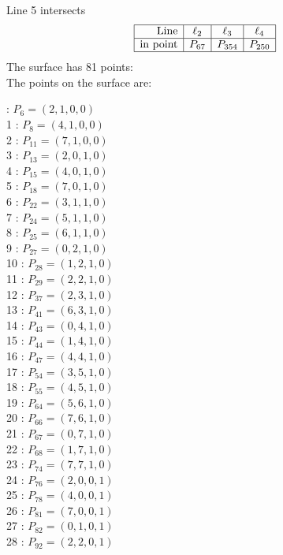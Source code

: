 \documentclass{article}
\begin{document}
{$$$$
Line 5 intersects 
$$
\begin{array}{|r*{3}{|c}|}
\hline
\mbox{Line}  & \ell_{2} & \ell_{3} & \ell_{4}\\
\hline
\mbox{in point}  & P_{67} & P_{354} & P_{250}\\
\hline
\end{array}
$$
The surface has 81 points:\\
The points on the surface are:\\
\begin{multicols}{3}
 : $P_{6}=( 2, 1, 0, 0 )$\\
1 : $P_{8}=( 4, 1, 0, 0 )$\\
2 : $P_{11}=( 7, 1, 0, 0 )$\\
3 : $P_{13}=( 2, 0, 1, 0 )$\\
4 : $P_{15}=( 4, 0, 1, 0 )$\\
5 : $P_{18}=( 7, 0, 1, 0 )$\\
6 : $P_{22}=( 3, 1, 1, 0 )$\\
7 : $P_{24}=( 5, 1, 1, 0 )$\\
8 : $P_{25}=( 6, 1, 1, 0 )$\\
9 : $P_{27}=( 0, 2, 1, 0 )$\\
10 : $P_{28}=( 1, 2, 1, 0 )$\\
11 : $P_{29}=( 2, 2, 1, 0 )$\\
12 : $P_{37}=( 2, 3, 1, 0 )$\\
13 : $P_{41}=( 6, 3, 1, 0 )$\\
14 : $P_{43}=( 0, 4, 1, 0 )$\\
15 : $P_{44}=( 1, 4, 1, 0 )$\\
16 : $P_{47}=( 4, 4, 1, 0 )$\\
17 : $P_{54}=( 3, 5, 1, 0 )$\\
18 : $P_{55}=( 4, 5, 1, 0 )$\\
19 : $P_{64}=( 5, 6, 1, 0 )$\\
20 : $P_{66}=( 7, 6, 1, 0 )$\\
21 : $P_{67}=( 0, 7, 1, 0 )$\\
22 : $P_{68}=( 1, 7, 1, 0 )$\\
23 : $P_{74}=( 7, 7, 1, 0 )$\\
24 : $P_{76}=( 2, 0, 0, 1 )$\\
25 : $P_{78}=( 4, 0, 0, 1 )$\\
26 : $P_{81}=( 7, 0, 0, 1 )$\\
27 : $P_{82}=( 0, 1, 0, 1 )$\\
28 : $P_{92}=( 2, 2, 0, 1 )$\\

\end{multicols}}
\end{document}
